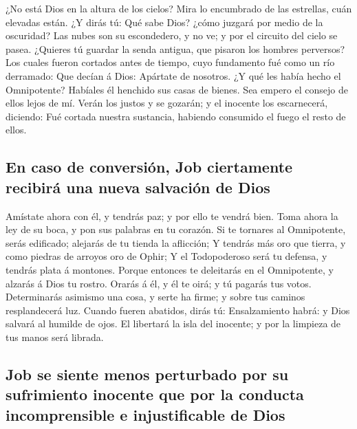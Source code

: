  ¿No está Dios en la altura de los cielos? Mira lo
encumbrado de las estrellas, cuán elevadas están.  ¿Y dirás
tú: Qué sabe Dios? ¿cómo juzgará por medio de la oscuridad?
 Las nubes son su escondedero, y no ve; y por el circuito
del cielo se pasea.  ¿Quieres tú guardar la senda antigua,
que pisaron los hombres perversos?  Los cuales fueron
cortados antes de tiempo, cuyo fundamento fué como un río derramado:
 Que decían á Dios: Apártate de nosotros. ¿Y qué les había
hecho el Omnipotente?  Habíales él henchido sus casas de
bienes. Sea empero el consejo de ellos lejos de mí.  Verán
los justos y se gozarán; y el inocente los escarnecerá, diciendo:
 Fué cortada nuestra sustancia, habiendo consumido el fuego
el resto de ellos.

\hypertarget{en-caso-de-conversiuxf3n-job-ciertamente-recibiruxe1-una-nueva-salvaciuxf3n-de-dios}{%
\subsection{En caso de conversión, Job ciertamente recibirá una nueva
salvación de
Dios}\label{en-caso-de-conversiuxf3n-job-ciertamente-recibiruxe1-una-nueva-salvaciuxf3n-de-dios}}

 Amístate ahora con él, y tendrás paz; y por ello te vendrá
bien.  Toma ahora la ley de su boca, y pon sus palabras en
tu corazón.  Si te tornares al Omnipotente, serás
edificado; alejarás de tu tienda la aflicción;  Y tendrás
más oro que tierra, y como piedras de arroyos oro de Ophir;
 Y el Todopoderoso será tu defensa, y tendrás plata á
montones.  Porque entonces te deleitarás en el Omnipotente,
y alzarás á Dios tu rostro.  Orarás á él, y él te oirá; y
tú pagarás tus votos.  Determinarás asimismo una cosa, y
serte ha firme; y sobre tus caminos resplandecerá luz. 
Cuando fueren abatidos, dirás tú: Ensalzamiento habrá: y Dios salvará al
humilde de ojos.  El libertará la isla del inocente; y por
la limpieza de tus manos será librada.

\hypertarget{job-se-siente-menos-perturbado-por-su-sufrimiento-inocente-que-por-la-conducta-incomprensible-e-injustificable-de-dios}{%
\subsection{Job se siente menos perturbado por su sufrimiento inocente
que por la conducta incomprensible e injustificable de
Dios}\label{job-se-siente-menos-perturbado-por-su-sufrimiento-inocente-que-por-la-conducta-incomprensible-e-injustificable-de-dios}}

